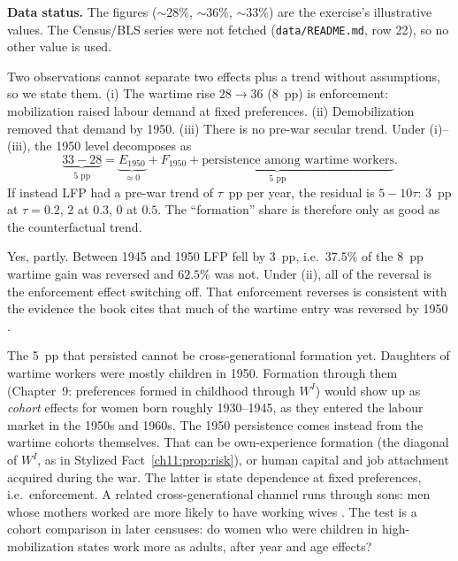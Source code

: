 \documentclass[../solutions_manual.tex]{subfiles}
\begin{document}
\textbf{Data status.} The figures ($\sim$28\%, $\sim$36\%, $\sim$33\%) are the exercise's illustrative values. The Census/BLS series were not fetched (\texttt{data/README.md}, row 22), so no other value is used.

 Two observations cannot separate two effects plus a trend without assumptions, so we state them. (i) The wartime rise $28 \to 36$ (8~pp) is enforcement: mobilization raised labour demand at fixed preferences. (ii) Demobilization removed that demand by 1950. (iii) There is no pre-war secular trend. Under (i)--(iii), the 1950 level decomposes as
\[
\underbrace{33 - 28}_{5\text{ pp}} = \underbrace{E_{1950}}_{\approx 0} + \underbrace{F_{1950} + \text{persistence among wartime workers}}_{5\text{ pp}} .
\]
If instead LFP had a pre-war trend of $\tau$~pp per year, the residual is $5 - 10\tau$: $3$~pp at $\tau = 0.2$, $2$ at $0.3$, $0$ at $0.5$. The ``formation'' share is therefore only as good as the counterfactual trend.

 Yes, partly. Between 1945 and 1950 LFP fell by 3~pp, i.e.\ $37.5\%$ of the 8~pp wartime gain was reversed and $62.5\%$ was not. Under (ii), all of the reversal is the enforcement effect switching off. That enforcement reverses is consistent with the evidence the book cites that much of the wartime entry was reversed by 1950 \citep{goldin1991role}.

 The 5~pp that persisted cannot be cross-generational formation yet. Daughters of wartime workers were mostly children in 1950. Formation through them (Chapter~9: preferences formed in childhood through $W^I$) would show up as \emph{cohort} effects for women born roughly 1930--1945, as they entered the labour market in the 1950s and 1960s. The 1950 persistence comes instead from the wartime cohorts themselves. That can be own-experience formation (the diagonal of $W^I$, as in Stylized Fact~\ref{ch11:prop:risk}), or human capital and job attachment acquired during the war. The latter is state dependence at fixed preferences, i.e.\ enforcement. A related cross-generational channel runs through sons: men whose mothers worked are more likely to have working wives \citep{fernandez2004mothers}. The test is a cohort comparison in later censuses: do women who were children in high-mobilization states work more as adults, after year and age effects?
\end{document}
